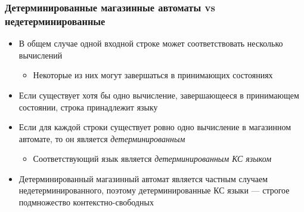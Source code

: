 \documentclass[dvipsnames]{beamer}
\newcommand{\state}[1]{{\color{red}{#1}}}
\newcommand{\stack}[1]{{\color{blue}{#1}}}
\newcommand{\symbl}[1]{{\color{PineGreen}{#1}}}
\newcommand{\conf}[3]{( \state{#1},\symbl{#2},\stack{#3} )}
\newenvironment{myauto}[1][3]
{
  \begin{center}
    \begin{tikzpicture}[> = stealth,node distance=#1cm, on grid, very thick]
}
{
    \end{tikzpicture}
  \end{center}
}
\begin{document}

\begin{frame}[fragile]
  \transwipe[direction=90]
  \frametitle{Детерминированные магазинные автоматы vs недетерминированные}
\begin{itemize}
	\item В общем случае одной входной строке может соответствовать несколько вычислений
	\begin{itemize}
		\item Некоторые из них могут завершаться в принимающих состояниях
	\end{itemize}
	\item Если существует хотя бы одно вычисление, завершающееся в принимающем состоянии, строка принадлежит языку
	\item Если для каждой строки существует ровно одно вычисление в магазинном автомате, то он является \emph{детерминированным}
	\begin{itemize}
		\item Соответствующий язык является \emph{детерминированным КС языком}
	\end{itemize}
	\item Детерминированный магазинный автомат является частным случаем недетерминированного, поэтому детерминированные КС языки --- строгое подмножество контекстно-свободных 
\end{itemize}
\end{frame}
\end{document}

